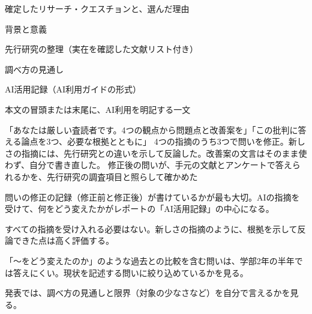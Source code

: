 \begin{achecks}
  \item 確定したリサーチ・クエスチョンと、選んだ理由
  \item 背景と意義
  \item 先行研究の整理（実在を確認した文献リスト付き）
  \item 調べ方の見通し
  \item AI活用記録（AI利用ガイドの形式）
  \item 本文の冒頭または末尾に、AI利用を明記する一文
\end{achecks}
{「あなたは厳しい査読者です。4つの観点から問題点と改善案を」「この批判に答える論点を3つ、必要な根拠とともに」}
{4つの指摘のうち3つで問いを修正。新しさの指摘には、先行研究との違いを示して反論した。改善案の文言はそのまま使わず、自分で書き直した。}
{修正後の問いが、手元の文献とアンケートで答えられるかを、先行研究の調査項目と照らして確かめた}

\begin{point}
  \item 問いの修正の記録（修正前と修正後）が書けているかが最も大切。AIの指摘を受けて、何をどう変えたかがレポートの「AI活用記録」の中心になる。
  \item すべての指摘を受け入れる必要はない。新しさの指摘のように、根拠を示して反論できた点は高く評価する。
  \item 「〜をどう変えたのか」のような過去との比較を含む問いは、学部2年の半年では答えにくい。現状を記述する問いに絞り込めているかを見る。
  \item 発表では、調べ方の見通しと限界（対象の少なさなど）を自分で言えるかを見る。
\end{point}
